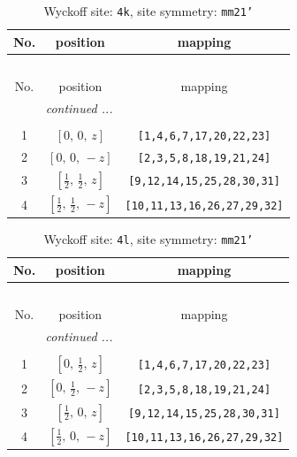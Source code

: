 \documentclass[fleqn,8pt]{jsarticle}
\begin{document}
\renewcommand{\arraystretch}{1.2}
\begin{longtable}{ccc}
\caption{Wyckoff site: {\tt 4k}, site symmetry: {\tt mm21'}}
 \\
 \hline \hline
No. & position & mapping \\ \hline \endfirsthead

\multicolumn{2}{l}{\tablename\ \thetable{}} \\
 \hline \hline
No. & position & mapping \\ \hline \endhead

 \hline \hline
\multicolumn{2}{r}{\footnotesize\it continued ...} \\ \endfoot

 \hline \hline
\multicolumn{2}{r}{} \\ \endlastfoot

1 & $\left[ 0,\, 0,\, z \right]$ & {\tt [1,4,6,7,17,20,22,23]} \\ \hline
2 & $\left[ 0,\, 0,\, - z \right]$ & {\tt [2,3,5,8,18,19,21,24]} \\ \hline
3 & $\left[ \frac{1}{2},\, \frac{1}{2},\, z \right]$ & {\tt [9,12,14,15,25,28,30,31]} \\ \hline
4 & $\left[ \frac{1}{2},\, \frac{1}{2},\, - z \right]$ & {\tt [10,11,13,16,26,27,29,32]} \\
\end{longtable}
\renewcommand{\arraystretch}{1.2}
\begin{longtable}{ccc}
\caption{Wyckoff site: {\tt 4l}, site symmetry: {\tt mm21'}}
 \\
 \hline \hline
No. & position & mapping \\ \hline \endfirsthead

\multicolumn{2}{l}{\tablename\ \thetable{}} \\
 \hline \hline
No. & position & mapping \\ \hline \endhead

 \hline \hline
\multicolumn{2}{r}{\footnotesize\it continued ...} \\ \endfoot

 \hline \hline
\multicolumn{2}{r}{} \\ \endlastfoot

1 & $\left[ 0,\, \frac{1}{2},\, z \right]$ & {\tt [1,4,6,7,17,20,22,23]} \\ \hline
2 & $\left[ 0,\, \frac{1}{2},\, - z \right]$ & {\tt [2,3,5,8,18,19,21,24]} \\ \hline
3 & $\left[ \frac{1}{2},\, 0,\, z \right]$ & {\tt [9,12,14,15,25,28,30,31]} \\ \hline
4 & $\left[ \frac{1}{2},\, 0,\, - z \right]$ & {\tt [10,11,13,16,26,27,29,32]} \\
\end{longtable}
\end{document}
